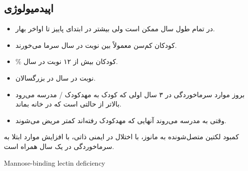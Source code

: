 \documentclass[12pt,a4paper]{article}
\begin{document}
\subsection*{اپیدمیولوژی}
\begin{itemize}
\item در تمام طول سال ممکن است ولی بیشتر در ابتدای پاییز تا اواخر بهار.
\item کودکان کم‌سن معمولاً بین  نوبت در سال سرما می‌خورند.
\item {}\% کودکان بیش از ۱۲ نوبت در سال.
\item {} نوبت در سال در بزرگسالان.
\item بروز موارد سرماخوردگی در ۳ سال اولی که کودک به مهدکودک / مدرسه می‌رود بالاتر از حالتی است که در خانه بماند.
\item وقتی به مدرسه می‌روند آنهایی که مهدکودک رفته‌اند کمتر مریض می‌شوند.
\end{itemize}
کمبود لکتین متصل‌شونده به مانوز، با اختلال در ایمنی ذاتی، با افزایش موارد ابتلا به سرماخوردگی در یک سال همراه است.
\begin{latin}\noindent Mannose-binding lectin deficiency\end{latin}

\end{document}
